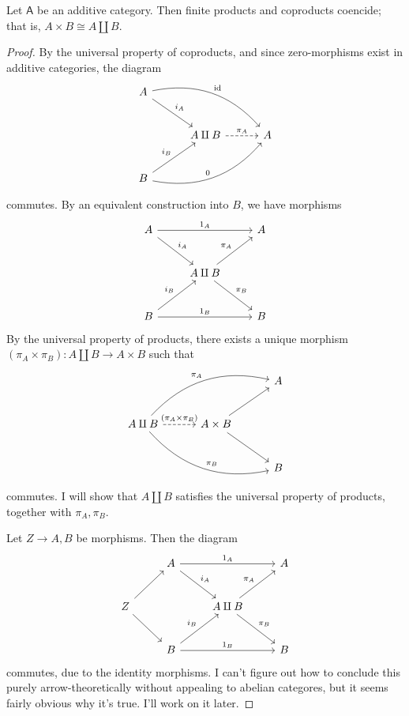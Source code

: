 \begin{proposition}\label{prp:9.4}
	Let $\mathsf{A} $ be an additive category. Then finite products and coproducts coencide; that is, $A\times B\cong A\amalg B$.
\end{proposition}
\begin{proof}
	By the universal property of coproducts, and since zero-morphisms exist in additive categories, the diagram
	\[\begin{tikzcd}[row sep = 2.5em, column sep = 3em]
		A\arrow[drr, bend left, "\mathrm{id}"]\arrow[dr, "i_A"]\\
		&A\amalg B\arrow[r, dashed, "\pi _A"]&A\\
		B\arrow[ur, "i_B"]\arrow[urr, bend right, "0"]
	\end{tikzcd}\]
	commutes. By an equivalent construction into $B$, we have morphisms
	\[\begin{tikzcd}[row sep = 2.5em, column sep = 2.5em]
		A\arrow[dr, "i_A"]\arrow[rr, "1_A"]&&A\\
				  &A\amalg B\arrow[ur, "\pi _A"]\arrow[dr, "\pi _B"]\\
		B\arrow[ur, "i_B"]\arrow[rr, "1_B"]&&B
	\end{tikzcd}\]
	By the universal property of products, there exists a unique morphism $(\pi_A\times \pi _B): A\amalg B \to A\times B$ such that
	\[\begin{tikzcd}[row sep = 2.5em, column sep = 3em]
		&&A\\
		A\amalg B\arrow[r, dashed, "(\pi_A\times \pi _B)"]\arrow[urr, bend left, "\pi _A"]\arrow[drr, bend right, "\pi _B"]&A\times B\arrow[ur]\arrow[dr]\\
															     &&B
	\end{tikzcd}\]
	commutes. I will show that $A\amalg B$ satisfies the universal property of products, together with $\pi _A,\pi _B$.

	Let $Z\to A,B$ be morphisms. Then the diagram
	\[\begin{tikzcd}[row sep = 2.5em, column sep = 2.5em]
		&A\arrow[dr, "i_A"]\arrow[rr, "1_A"]&&A\\
		Z\arrow[ru]\arrow[dr]&&A\amalg B\arrow[ur, "\pi _A"]\arrow[dr, "\pi_B"]\\
				     &B\arrow[ur, "i_B"]\arrow[rr, "1_B"]&&B
	\end{tikzcd}\]
	commutes, due to the identity morphisms. I can't figure out how to conclude this purely arrow-theoretically without appealing to abelian categores, but it seems fairly obvious why it's true. I'll work on it later.
\end{proof}

